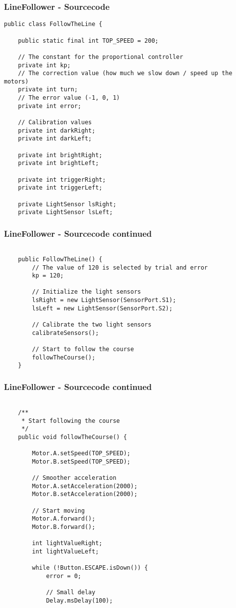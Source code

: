 \documentclass{beamer}
\begin{document}
\begin{frame}[fragile] %
\frametitle{LineFollower - Sourcecode}
\begin{lstlisting}
public class FollowTheLine {

	public static final int TOP_SPEED = 200;

	// The constant for the proportional controller
	private int kp;
	// The correction value (how much we slow down / speed up the motors)
	private int turn;
	// The error value (-1, 0, 1)
	private int error;

	// Calibration values
	private int darkRight;
	private int darkLeft;

	private int brightRight;
	private int brightLeft;

	private int triggerRight;
	private int triggerLeft;

	private LightSensor lsRight;
	private LightSensor lsLeft;

\end{lstlisting}
\end{frame}

\begin{frame}[fragile]
\frametitle{LineFollower - Sourcecode continued}
\begin{lstlisting}[firstnumber = 24]

	public FollowTheLine() {
		// The value of 120 is selected by trial and error
		kp = 120; 

		// Initialize the light sensors
		lsRight = new LightSensor(SensorPort.S1);
		lsLeft = new LightSensor(SensorPort.S2);

		// Calibrate the two light sensors
		calibrateSensors();

		// Start to follow the course
		followTheCourse();
	}

\end{lstlisting}
\end{frame}

\begin{frame}[fragile]
\frametitle{LineFollower - Sourcecode continued}
\begin{lstlisting}[firstnumber = 39]

	/**
	 * Start following the course
	 */
	public void followTheCourse() {

		Motor.A.setSpeed(TOP_SPEED);
		Motor.B.setSpeed(TOP_SPEED);

		// Smoother acceleration
		Motor.A.setAcceleration(2000);
		Motor.B.setAcceleration(2000);

		// Start moving
		Motor.A.forward();
		Motor.B.forward();

		int lightValueRight;
		int lightValueLeft;

		while (!Button.ESCAPE.isDown()) {
			error = 0;

			// Small delay
			Delay.msDelay(100); 
			
\end{lstlisting}
\end{frame}
\end{document}
